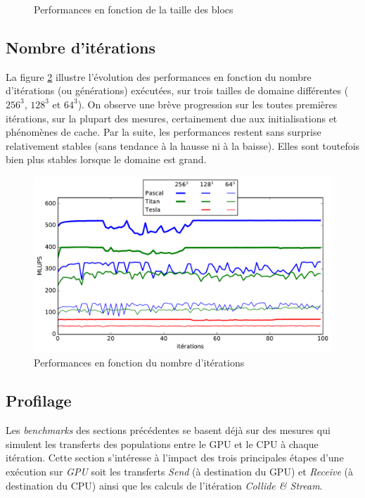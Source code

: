 \begin{figure}[h]
{		\label{fig:lups_by_bs_tesla}
	}
	\caption{Performances en fonction de la taille des blocs}
	\label{fig:lups_by_bs}
\end{figure}

\subsection{Nombre d'itérations}\label{title-iterations}

La figure \ref{fig:lups_by_iter} illustre l'évolution des performances en fonction du nombre d'itérations (ou générations) exécutées, sur trois tailles de domaine différentes ($256^3$, $128^3$ et $64^3$). On observe une brève progression sur les toutes premières itérations, sur la plupart des mesures, certainement due aux initialisations et phénomènes de cache. Par la suite, les performances restent sans surprise relativement stables (sans tendance à la hausse ni à la baisse). Elles sont toutefois bien plus stables lorsque le domaine est grand. 

\begin{figure}[H]
	\centering
	\includegraphics[fbox, scale=0.61]{images/perfs/lbm_simple_lbmcuda/lups_by_iter.pdf}
	\caption{Performances en fonction du nombre d'itérations}
	\label{fig:lups_by_iter}
\end{figure}

\subsection{Profilage} \label{title-profilage_gpu}
Les \textit{benchmarks} des sections précédentes se basent déjà sur des mesures qui simulent les transferts des populations entre le \acs{GPU} et le \acs{CPU} à chaque itération. Cette section s'intéresse à l'impact des trois principales étapes d'une exécution sur \textit{GPU} soit les transferts \textit{Send} (à destination du \acs{GPU}) et \textit{Receive} (à destination du \acs{CPU}) ainsi que les calculs de l'itération \textit{Collide \& Stream}.
	
